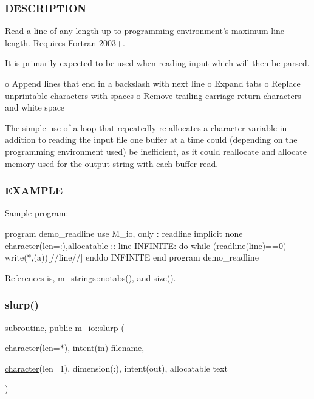 \subsubsection*{D\+E\+S\+C\+R\+I\+P\+T\+I\+ON}

\begin{DoxyVerb}Read a line of any length up to programming environment's maximum
line length. Requires Fortran 2003+.

It is primarily expected to be used when reading input which will
then be parsed.

o Append lines that end in a backslash with next line
o Expand tabs
o Replace unprintable characters with spaces
o Remove trailing carriage return characters and white space

The simple use of a loop that repeatedly re-allocates a character
variable in addition to reading the input file one buffer at a
time could (depending on the programming environment used) be
inefficient, as it could reallocate and allocate memory used for
the output string with each buffer read.
\end{DoxyVerb}


\subsubsection*{E\+X\+A\+M\+P\+LE}

Sample program\+:

program demo\+\_\+readline use M\+\_\+io, only \+: readline implicit none character(len=\+:),allocatable \+:\+: line I\+N\+F\+I\+N\+I\+TE\+: do while (readline(line)==0) write($\ast$,\textquotesingle{}(a)\textquotesingle{})\textquotesingle{}\mbox{[}\textquotesingle{}//line//\textquotesingle{}\mbox{]}\textquotesingle{} enddo I\+N\+F\+I\+N\+I\+TE end program demo\+\_\+readline 

References is, m\+\_\+strings\+::notabs(), and size().

\mbox{\label{namespacem__io_ad25822cde8058cd6861e2d9a5d729ccc}} 
\subsubsection{\texorpdfstring{slurp()}{slurp()}}
{\footnotesize\ttfamily \hyperlink{M__stopwatch_83_8txt_acfbcff50169d691ff02d4a123ed70482}{subroutine}, \hyperlink{M__stopwatch_83_8txt_a2f74811300c361e53b430611a7d1769f}{public} m\+\_\+io\+::slurp (\begin{DoxyParamCaption}\item[{\hyperlink{option__stopwatch_83_8txt_abd4b21fbbd175834027b5224bfe97e66}{character}(len=$\ast$), intent(\hyperlink{M__journal_83_8txt_afce72651d1eed785a2132bee863b2f38}{in})}]{filename,  }\item[{\hyperlink{option__stopwatch_83_8txt_abd4b21fbbd175834027b5224bfe97e66}{character}(len=1), dimension(\+:), intent(out), allocatable}]{text }\end{DoxyParamCaption})}



